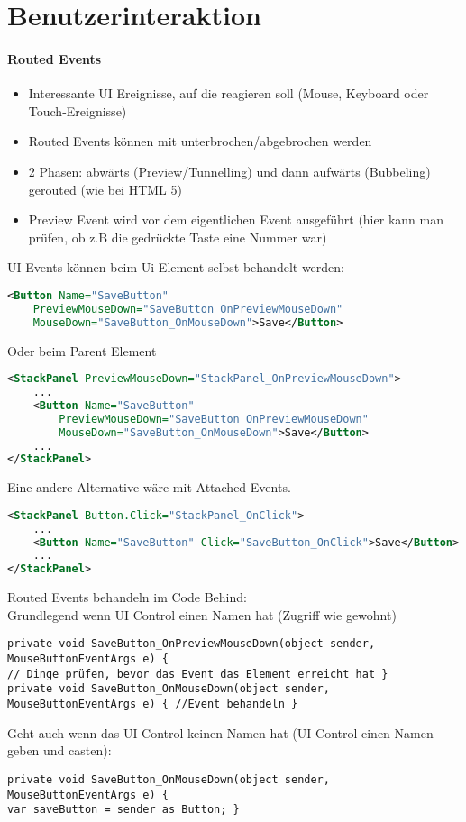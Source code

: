 \section{Benutzerinteraktion}
\paragraph{Routed Events}
\begin{itemize}
    \item Interessante UI Ereignisse, auf die reagieren soll (Mouse, Keyboard oder Touch-Ereignisse)
    \item Routed Events können mit  unterbrochen/abgebrochen werden
    \item 2 Phasen: abwärts (Preview/Tunnelling) und dann aufwärts (Bubbeling) gerouted (wie bei HTML 5) 
    \item Preview Event wird vor dem eigentlichen Event ausgeführt (hier kann man prüfen, ob z.B die gedrückte Taste eine Nummer war)
\end{itemize}
UI Events können beim Ui Element selbst behandelt werden:
\begin{lstlisting}[language=xml]
<Button Name="SaveButton"
    PreviewMouseDown="SaveButton_OnPreviewMouseDown"
    MouseDown="SaveButton_OnMouseDown">Save</Button>
\end{lstlisting}


Oder beim Parent Element
\begin{lstlisting}[language=xml]
<StackPanel PreviewMouseDown="StackPanel_OnPreviewMouseDown">
    ...
    <Button Name="SaveButton"
        PreviewMouseDown="SaveButton_OnPreviewMouseDown"
        MouseDown="SaveButton_OnMouseDown">Save</Button>
    ...
</StackPanel>
\end{lstlisting}


Eine andere Alternative wäre mit Attached Events.
\begin{lstlisting}[language=xml]
<StackPanel Button.Click="StackPanel_OnClick">
    ...
    <Button Name="SaveButton" Click="SaveButton_OnClick">Save</Button>
    ...
</StackPanel>
\end{lstlisting}

Routed Events behandeln im Code Behind: \\
Grundlegend wenn UI Control einen Namen hat (Zugriff wie gewohnt)
\begin{lstlisting}
private void SaveButton_OnPreviewMouseDown(object sender, MouseButtonEventArgs e) { 
// Dinge prüfen, bevor das Event das Element erreicht hat } 
private void SaveButton_OnMouseDown(object sender, MouseButtonEventArgs e) { //Event behandeln } 
\end{lstlisting}
Geht auch wenn das UI Control keinen Namen hat (UI Control einen Namen geben und casten):
\begin{lstlisting}
private void SaveButton_OnMouseDown(object sender, MouseButtonEventArgs e) { 
var saveButton = sender as Button; }
\end{lstlisting}


